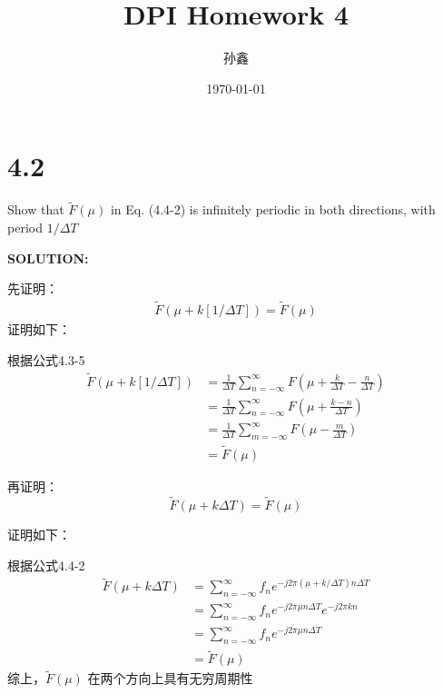 \documentclass[UTF8,titlepage]{ctexart}
\title{DPI Homework 4}
\author{孙鑫}
\date{\today}
\newcommand{\suminf}{\sum_{n=-\infty}^{\infty}}
\begin{document}
\maketitle
\section*{4.2}
\setlength{\parindent}{0pt}Show that $\tilde{F}(\mu)$ in Eq. (4.4-2) is infinitely periodic in both directions, with period $1/\Delta T$

\textbf{SOLUTION:}

先证明：
\begin{align*}
    \tilde{F}(\mu+k[1/\Delta T])=\tilde{F}(\mu)
\end{align*}
证明如下：

根据公式4.3-5
\begin{align*}
    \tilde{F}(\mu+k[1/\Delta T]) & =\frac{1}{\Delta T}\sum_{n=-\infty}^{\infty}F(\mu+\frac{k}{\Delta T}-\frac{n}{\Delta T})\\
        & = \frac{1}{\Delta T}\sum_{n=-\infty}^{\infty}F(\mu+\frac{k-n}{\Delta T})\\
        & = \frac{1}{\Delta T}\sum_{m=-\infty}^{\infty}F(\mu-\frac{m}{\Delta T})\\
        & = \tilde{F}(\mu)
\end{align*}

再证明：
\begin{displaymath}
    \tilde{F}(\mu+k\Delta T)=\tilde{F}(\mu)
\end{displaymath}

证明如下：

根据公式4.4-2
\begin{align*}
    \tilde{F}(\mu+k\Delta T) &=\suminf f_ne^{-j2\pi(\mu+k/\Delta T)n\Delta T}\\
    &=\suminf f_ne^{-j2\pi\mu n\Delta T}e^{-j2\pi kn}\\
    &=\suminf f_ne^{-j2\pi\mu n\Delta T}\\
    &=\tilde{F}(\mu)
\end{align*}
综上，$\tilde{F}(\mu)$ 在两个方向上具有无穷周期性
\end{document}
